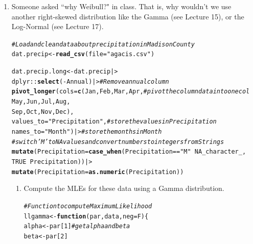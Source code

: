 \documentclass{article}\usepackage[]{graphicx}\usepackage[]{xcolor}
\makeatletter
\newcommand{\hlnum}[1]{\textcolor[rgb]{0.686,0.059,0.569}{#1}}%
\newcommand{\hlsng}[1]{\textcolor[rgb]{0.192,0.494,0.8}{#1}}%
\newcommand{\hlcom}[1]{\textcolor[rgb]{0.678,0.584,0.686}{\textit{#1}}}%
\newcommand{\hlopt}[1]{\textcolor[rgb]{0,0,0}{#1}}%
\newcommand{\hldef}[1]{\textcolor[rgb]{0.345,0.345,0.345}{#1}}%
\newcommand{\hlkwa}[1]{\textcolor[rgb]{0.161,0.373,0.58}{\textbf{#1}}}%
\newcommand{\hlkwb}[1]{\textcolor[rgb]{0.69,0.353,0.396}{#1}}%
\newcommand{\hlkwc}[1]{\textcolor[rgb]{0.333,0.667,0.333}{#1}}%
\newcommand{\hlkwd}[1]{\textcolor[rgb]{0.737,0.353,0.396}{\textbf{#1}}}%
\newenvironment{kframe}{%
 \def\at@end@of@kframe{}%
 \ifinner\ifhmode%
  \def\at@end@of@kframe{\end{minipage}}%
  \begin{minipage}{\columnwidth}%
 \fi\fi%
 \def\FrameCommand##1{\hskip\@totalleftmargin \hskip-\fboxsep
 \colorbox{shadecolor}{##1}\hskip-\fboxsep
     \hskip-\linewidth \hskip-\@totalleftmargin \hskip\columnwidth}%
 \MakeFramed {\advance\hsize-\width
   \@totalleftmargin\z@ \linewidth\hsize
   \@setminipage}}%
 {\par\unskip\endMakeFramed%
 \at@end@of@kframe}
\newenvironment{knitrout}{}{} %
\makeatother
\begin{document}
\begin{enumerate}
  \item Someone asked ``why Weibull?" in class. That is, why wouldn't we use 
  another right-skewed distribution like the Gamma (see Lecture 15), or
  the Log-Normal (see Lecture 17).
  
\begin{knitrout}\scriptsize
{}\color{fgcolor}\begin{kframe}
\begin{alltt}
\hlcom{# Load and clean data about precipitation in Madison County}
\hldef{dat.precip} \hlkwb{<-} \hlkwd{read_csv}\hldef{(}\hlkwc{file} \hldef{=} \hlsng{"agacis.csv"}\hldef{)}

\hldef{dat.precip.long} \hlkwb{<-} \hldef{dat.precip |>}
\hldef{dplyr}\hlopt{::}\hlkwd{select}\hldef{(}\hlopt{-}\hldef{Annual) |>}                   \hlcom{# Remove annual column }
\hlkwd{pivot_longer}\hldef{(}\hlkwc{cols} \hldef{=} \hlkwd{c}\hldef{(Jan, Feb, Mar, Apr,}   \hlcom{# pivot the column data into one col}
                      \hldef{May, Jun, Jul, Aug,}
                      \hldef{Sep, Oct, Nov, Dec),}
             \hlkwc{values_to} \hldef{=} \hlsng{"Precipitation"}\hldef{,}   \hlcom{# store the values in Precipitation}
             \hlkwc{names_to} \hldef{=} \hlsng{"Month"}\hldef{) |>}         \hlcom{# store the months in Month}
\hlcom{#switch 'M' to NA values and convert numbers to integers from Strings}
\hlkwd{mutate}\hldef{(}\hlkwc{Precipitation} \hldef{=} \hlkwd{case_when}\hldef{(Precipitation} \hlopt{==} \hlsng{"M"} \hlopt{~} \hlnum{NA_character_}\hldef{,}
                                 \hlnum{TRUE}                 \hlopt{~} \hldef{Precipitation))|>}
\hlkwd{mutate}\hldef{(}\hlkwc{Precipitation} \hldef{=} \hlkwd{as.numeric}\hldef{(Precipitation))}
\end{alltt}
\end{kframe}
\end{knitrout}
\begin{enumerate}
    \item Compute the MLEs for these data using a Gamma distribution.
\begin{knitrout}\scriptsize
{}\color{fgcolor}\begin{kframe}
\begin{alltt}
\hlcom{#Function to compute Maximum Likelihood}
\hldef{llgamma} \hlkwb{<-} \hlkwa{function}\hldef{(}\hlkwc{par}\hldef{,} \hlkwc{data}\hldef{,} \hlkwc{neg} \hldef{= F)\{}
  \hldef{alpha} \hlkwb{<-} \hldef{par[}\hlnum{1}\hldef{]} \hlcom{#get alpha and beta}
  \hldef{beta} \hlkwb{<-} \hldef{par[}\hlnum{2}\hldef{]}


\end{alltt}
\end{kframe}
\end{knitrout}
\end{enumerate}
\end{enumerate}
\end{document}
